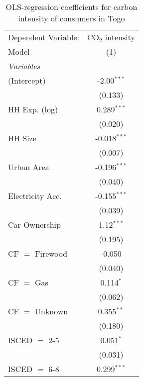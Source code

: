 
\begin{table}[htbp!]
   \centering
   \small
   \begin{adjustbox}{width = 1\textwidth, max height = 0.95\textheight, center}
      \begin{threeparttable}[b]
         \caption{\label{tab:OLS_1_TGO} OLS-regression coefficients for carbon intensity of consumers in Togo}
         \begin{tabular}{lc}
            \tabularnewline \midrule \midrule
            Dependent Variable: & CO$_{2}$ intensity\\  
            Model               & (1)\\  
            \midrule
            \emph{Variables}\\
            (Intercept)         & -2.00$^{***}$\\   
                                & (0.133)\\   
            HH Exp. (log)       & 0.289$^{***}$\\   
                                & (0.020)\\   
            HH Size             & -0.018$^{***}$\\   
                                & (0.007)\\   
            Urban Area          & -0.196$^{***}$\\   
                                & (0.040)\\   
            Electricity Acc.    & -0.155$^{***}$\\   
                                & (0.039)\\   
            Car Ownership       & 1.12$^{***}$\\   
                                & (0.195)\\   
            CF $=$ Firewood     & -0.050\\   
                                & (0.040)\\   
            CF $=$ Gas          & 0.114$^{*}$\\   
                                & (0.062)\\   
            CF $=$ Unknown      & 0.355$^{**}$\\   
                                & (0.180)\\   
            ISCED $=$ 2-5       & 0.051$^{*}$\\   
                                & (0.031)\\   
            ISCED $=$ 6-8       & 0.299$^{***}$\\   

\end{tabular}
\end{threeparttable}
\end{adjustbox}
\end{table}
